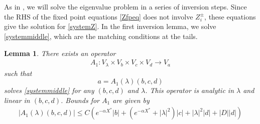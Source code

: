 \documentclass[10pt,reqno]{amsart}
\theoremstyle{plain}
\newtheorem{lemma}[theorem]{Lemma}
\theoremstyle{definition}
\theoremstyle{remark}
\numberwithin{theorem}{section}
\numberwithin{equation}{section}
\begin{document}
As in \cite{Sandstede1998}, we will solve the eigenvalue problem in a series of inversion steps. Since the RHS of the fixed point equations \cref{Zfpeq} does not involve $Z_i^\pm$, these equations give the solution for \cref{systemZ}. In the first inversion lemma, we solve \cref{systemmiddle}, which are the matching conditions at the tails.

\begin{lemma}\label{Zinv1}
There exists an operator
\begin{align*}
A_1: V_\lambda \times V_b \times V_c \times V_d \rightarrow V_a
\end{align*}
such that 
\[
a = A_1(\lambda)(b, c, d)
\]
solves \eqref{systemmiddle} for any $(b, c, d)$ and $\lambda$. This operator is analytic in $\lambda$ and linear in $(b, c, d)$. Bounds for $A_1$ are given by
\begin{align}\label{A1bound}
|A_1(\lambda)(b, c, d)| \leq C \left( e^{-\alpha X^*} |b| + (e^{-\alpha X^*} + |\lambda|^2)|c| + |\lambda|^2 |d| + |D||d| \right)
\end{align} 


\end{lemma}
\end{document}
